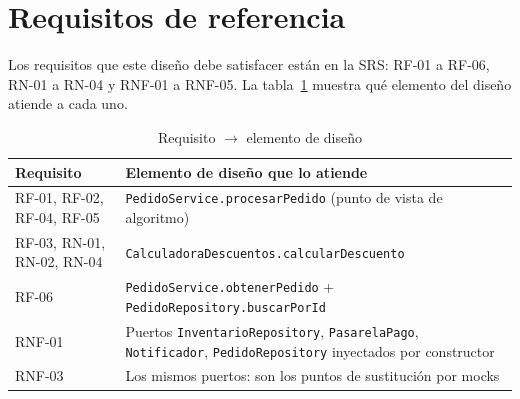 \documentclass[11pt,a4paper,oneside]{report}
\newcommand{\code}[1]{\texttt{#1}}
\begin{document}
\section{Requisitos de referencia}
Los requisitos que este diseño debe satisfacer están en la SRS: RF-01 a RF-06, RN-01 a RN-04 y RNF-01 a RNF-05. La tabla~\ref{tab:diseno-req} muestra qué elemento del diseño atiende a cada uno.

\begin{table}[H]
\centering
\caption{Requisito $\rightarrow$ elemento de diseño}
\label{tab:diseno-req}
\small
\begin{tabularx}{\linewidth}{lX}
\toprule
\textbf{Requisito} & \textbf{Elemento de diseño que lo atiende}\\
\midrule
RF-01, RF-02, RF-04, RF-05 & \code{PedidoService.procesarPedido} (punto de vista de algoritmo)\\
RF-03, RN-01, RN-02, RN-04 & \code{CalculadoraDescuentos.calcularDescuento}\\
RF-06 & \code{PedidoService.obtenerPedido} + \code{PedidoRepository.buscarPorId}\\
RNF-01 & Puertos \code{InventarioRepository}, \code{PasarelaPago}, \code{Notificador}, \code{PedidoRepository} inyectados por constructor\\
RNF-03 & Los mismos puertos: son los puntos de sustitución por mocks\\
\bottomrule
\end{tabularx}
\end{table}
\end{document}

